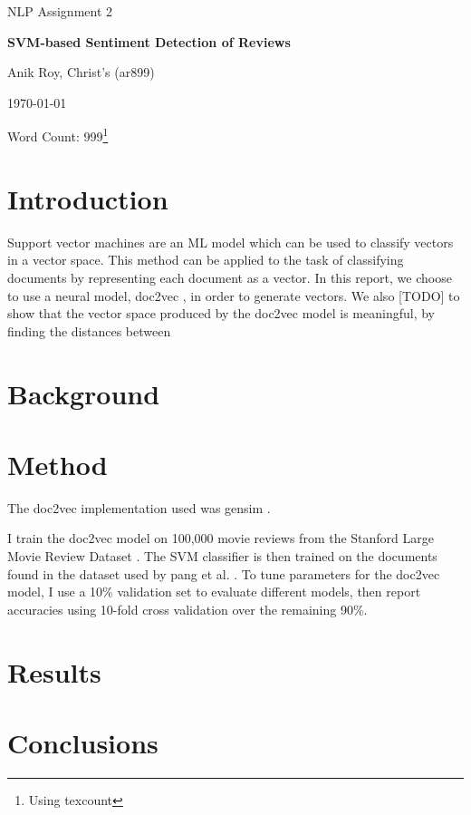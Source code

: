 \documentclass[12pt,a4paper]{article}
\begin{document}
\centerline{\large NLP Assignment 2}
\vspace{0.2in}
\centerline{\Large\bf SVM-based Sentiment Detection of Reviews}
\vspace{0.1in}
\centerline{\large {Anik Roy, Christ's (ar899)}}
\vspace{0.1in}
\centerline{\large {\today}}
\vspace{0.05in}
\centerline{Word Count: 999\footnote{Using texcount}}
\vspace{0.2in}


\begin{multicols}{2}
  
\section{Introduction}

Support vector machines are an ML model which can be used to classify vectors in a vector space. This method can be applied to the task of classifying documents by representing each document as a vector. In this report, we choose to use a neural model, doc2vec \cite{}, in order to generate vectors. We also [TODO] to show that the vector space produced by the doc2vec model is meaningful, by finding the distances between 

\section{Background}
\blindtext
\section{Method}

The doc2vec implementation used was gensim \cite{gensim}.

I train the doc2vec model on 100,000 movie reviews from the Stanford Large Movie Review Dataset \cite{maas-EtAl:2011:ACL-HLT2011}. The SVM classifier is then trained on the documents found in the dataset used by pang et al. \cite{pang2002thumbs}. To tune parameters for the doc2vec model, I use a 10\% validation set to evaluate different models, then report accuracies using 10-fold cross validation over the remaining 90\%.

\section{Results}
\blindtext
\section{Conclusions}
\blindtext

\end{multicols}

\clearpage


\end{document}
